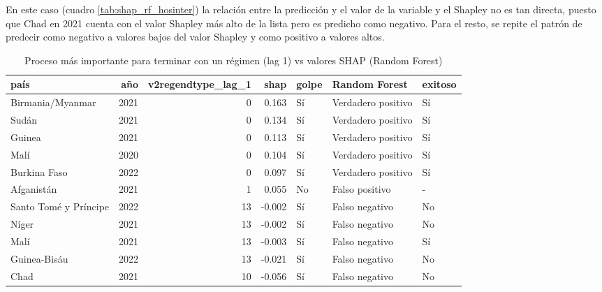 \documentclass{article}
\begin{document}
En este caso (cuadro \ref{tab:shap_rf_hosinter}) la relación entre la predicción y el valor de la 
variable y el Shapley no es tan directa, puesto que Chad en 2021 cuenta con el valor Shapley más 
alto de la lista pero es predicho como negativo. Para el resto, se repite el patrón de predecir 
como negativo a valores bajos del valor Shapley y como positivo a valores altos.

\begin{table}[H]
  \centering
  \begin{tabular}{lrrrlll}
    \toprule
    país & año & v2regendtype\_lag\_1 & shap & golpe & Random Forest & exitoso \\
    \midrule
    Birmania/Myanmar & 2021 & 0 & 0.163 & Sí & Verdadero positivo & Sí \\
    Sudán & 2021 & 0 & 0.134 & Sí & Verdadero positivo & Sí \\
    Guinea & 2021 & 0 & 0.113 & Sí & Verdadero positivo & Sí \\
    Malí & 2020 & 0 & 0.104 & Sí & Verdadero positivo & Sí \\
    Burkina Faso & 2022 & 0 & 0.097 & Sí & Verdadero positivo & Sí \\
    Afganistán & 2021 & 1 & 0.055 & No & Falso positivo & - \\
    Santo Tomé y Príncipe & 2022 & 13 & -0.002 & Sí & Falso negativo & No \\
    Níger & 2021 & 13 & -0.002 & Sí & Falso negativo & No \\
    Malí & 2021 & 13 & -0.003 & Sí & Falso negativo & Sí \\
    Guinea-Bisáu & 2022 & 13 & -0.021 & Sí & Falso negativo & No \\
    Chad & 2021 & 10 & -0.056 & Sí & Falso negativo & No \\
    \bottomrule
    \end{tabular}
\caption{Proceso más importante para terminar con un régimen (lag 1) vs valores 
          SHAP (Random Forest) \label{tab:shap_rf_regend}}
\end{table}
\end{document}
